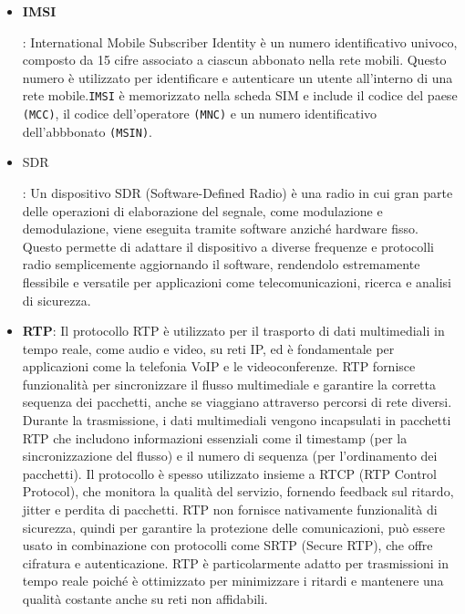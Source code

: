 \documentclass[english]{article}
\begin{document}
\begin{itemize}
	\item \hypertarget{IMSI}{\textbf{IMSI}}: International Mobile Subscriber Identity
	      è un numero identificativo univoco,
	      composto da 15 cifre associato a ciascun abbonato nella rete mobili.
	      Questo numero è utilizzato per identificare e autenticare un utente all'interno
	      di una rete mobile.\@ \texttt{IMSI} è memorizzato nella scheda SIM e include il
	      codice del paese \texttt{(MCC)},
	      il codice dell'operatore \texttt{(MNC)}
	      e un numero identificativo dell'abbbonato \texttt{(MSIN)}.

	\item \hypertarget{SDR}{SDR}: Un dispositivo SDR (Software-Defined Radio)
	      è una radio in cui gran parte delle operazioni di elaborazione del segnale,
	      come modulazione e demodulazione, viene eseguita tramite software anziché hardware fisso.
	      Questo permette di adattare il dispositivo a diverse frequenze e protocolli radio
	      semplicemente aggiornando il software, rendendolo estremamente flessibile e versatile
	      per applicazioni come telecomunicazioni, ricerca e analisi di sicurezza.

	\item \textbf{\hypertarget{RTP}{RTP}}: Il protocollo RTP è utilizzato per
	      il trasporto di dati multimediali in tempo reale, come audio e video,
	      su reti IP, ed è fondamentale per applicazioni come la telefonia VoIP e
	      le videoconferenze. RTP fornisce funzionalità per sincronizzare il
	      flusso multimediale e garantire la corretta sequenza dei pacchetti,
	      anche se viaggiano attraverso percorsi di rete diversi.
	      Durante la trasmissione, i dati multimediali vengono incapsulati in pacchetti
	      RTP che includono informazioni essenziali come il timestamp
	      (per la sincronizzazione del flusso) e il numero di sequenza
	      (per l'ordinamento dei pacchetti). Il protocollo è spesso utilizzato insieme
	      a RTCP (RTP Control Protocol), che monitora la qualità del servizio,
	      fornendo feedback sul ritardo, jitter e perdita di pacchetti.
	      RTP non fornisce nativamente funzionalità di sicurezza,
	      quindi per garantire la protezione delle comunicazioni,
	      può essere usato in combinazione con protocolli come
	      SRTP (Secure RTP), che offre cifratura e autenticazione.
	      RTP è particolarmente adatto per trasmissioni in tempo reale poiché
	      è ottimizzato per minimizzare i ritardi e mantenere una qualità
	      costante anche su reti non affidabili.


\end{itemize}
\end{document}

